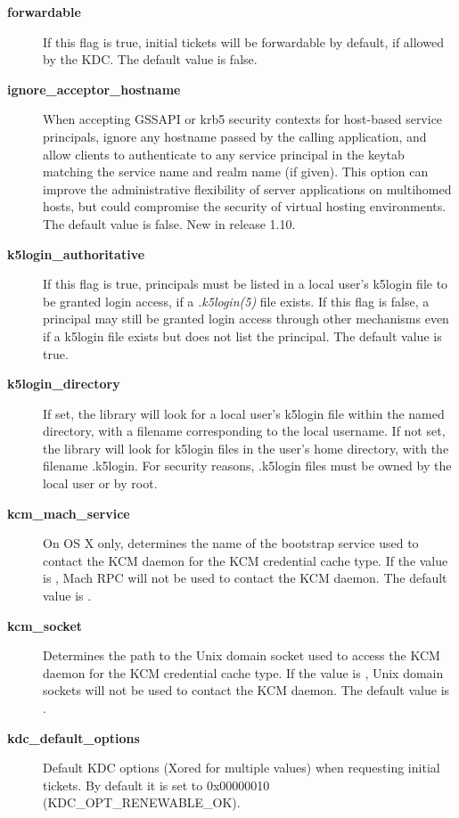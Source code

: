 \documentclass[letterpaper,10pt,english]{sphinxmanual}
\begin{document}
\begin{description}
\item[{\textbf{forwardable}}] \leavevmode
If this flag is true, initial tickets will be forwardable by
default, if allowed by the KDC.  The default value is false.

\item[{\textbf{ignore\_acceptor\_hostname}}] \leavevmode
When accepting GSSAPI or krb5 security contexts for host-based
service principals, ignore any hostname passed by the calling
application, and allow clients to authenticate to any service
principal in the keytab matching the service name and realm name
(if given).  This option can improve the administrative
flexibility of server applications on multihomed hosts, but could
compromise the security of virtual hosting environments.  The
default value is false.  New in release 1.10.

\item[{\textbf{k5login\_authoritative}}] \leavevmode
If this flag is true, principals must be listed in a local user's
k5login file to be granted login access, if a \emph{.k5login(5)}
file exists.  If this flag is false, a principal may still be
granted login access through other mechanisms even if a k5login
file exists but does not list the principal.  The default value is
true.

\item[{\textbf{k5login\_directory}}] \leavevmode
If set, the library will look for a local user's k5login file
within the named directory, with a filename corresponding to the
local username.  If not set, the library will look for k5login
files in the user's home directory, with the filename .k5login.
For security reasons, .k5login files must be owned by
the local user or by root.

\item[{\textbf{kcm\_mach\_service}}] \leavevmode
On OS X only, determines the name of the bootstrap service used to
contact the KCM daemon for the KCM credential cache type.  If the
value is \code{-}, Mach RPC will not be used to contact the KCM
daemon.  The default value is .

\item[{\textbf{kcm\_socket}}] \leavevmode
Determines the path to the Unix domain socket used to access the
KCM daemon for the KCM credential cache type.  If the value is
\code{-}, Unix domain sockets will not be used to contact the KCM
daemon.  The default value is
.

\item[{\textbf{kdc\_default\_options}}] \leavevmode
Default KDC options (Xored for multiple values) when requesting
initial tickets.  By default it is set to 0x00000010
(KDC\_OPT\_RENEWABLE\_OK).


\end{description}
\end{document}
